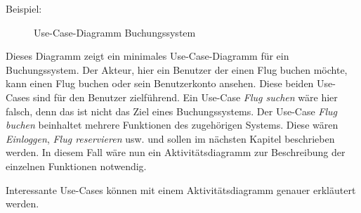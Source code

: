 Beispiel:

\begin{figure}[ht]
\centering
\caption{Use-Case-Diagramm Buchungssystem}
\end{figure}

Dieses Diagramm zeigt ein minimales Use-Case-Diagramm für ein Buchungssystem.
Der Akteur, hier ein Benutzer der einen Flug buchen möchte, kann einen Flug buchen oder
sein Benutzerkonto ansehen. Diese beiden Use-Cases sind für den Benutzer zielführend.
Ein Use-Case \emph{Flug suchen} wäre hier falsch, denn das ist nicht das Ziel eines Buchungssystems. 
Der Use-Case \emph{Flug buchen} beinhaltet mehrere Funktionen des zugehörigen Systems. 
Diese wären \emph{Einloggen}, \emph{Flug reservieren} usw. und sollen im nächsten Kapitel beschrieben werden. 
In diesem Fall wäre nun ein Aktivitätsdiagramm zur Beschreibung der einzelnen Funktionen notwendig.


Interessante Use-Cases können mit einem Aktivitätsdiagramm genauer erkläutert werden.
